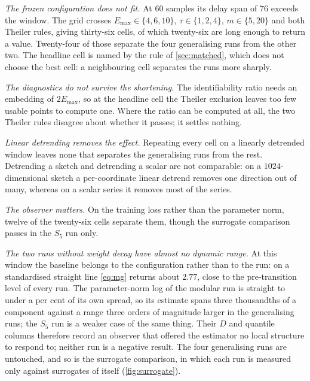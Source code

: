 \documentclass{article}
\begin{document}
\emph{The frozen configuration does not fit.} At $60$ samples its delay span of $76$ exceeds the
window. The grid crosses $E_{\max} \in \{4, 6, 10\}$,
$\tau \in \{1, 2, 4\}$, $m \in \{5, 20\}$ and both Theiler rules, giving thirty-six cells, of which
twenty-six are long enough to return a value. Twenty-four of those separate the four generalising
runs from the other two. The headline cell is named by the rule of \cref{sec:matched}, which does
not choose the best cell: a neighbouring cell separates the runs more sharply.

\emph{The diagnostics do not survive the shortening.} The identifiability ratio needs an embedding
of $2E_{\max}$, so at the headline cell the Theiler exclusion leaves too few usable points to
compute one. Where the ratio can be computed at all, the two Theiler rules disagree about whether
it passes; it settles nothing.

\emph{Linear detrending removes the effect.} Repeating every cell on a linearly detrended window
leaves none that separates the generalising runs from the rest. Detrending a sketch and
detrending a scalar are not comparable: on a $1024$-dimensional sketch a per-coordinate linear
detrend removes one direction out of many, whereas on a scalar series it removes most of the
series.

\emph{The observer matters.} On the training loss rather than the parameter norm, twelve of the
twenty-six cells separate them, though the surrogate comparison passes in the $S_5$ run
only.

\emph{The two runs without weight decay have almost no dynamic range.} At this window the baseline
belongs to the configuration rather than to the run: on a standardised straight line \cref{eq:mg}
returns about $2.77$, close to the pre-transition level of every run. The parameter-norm log of the
modular run is straight to under a per cent of its own spread, so its estimate spans three
thousandths of a component against a range three orders of magnitude larger in the generalising
runs; the $S_5$ run is a weaker case of the same thing. Their $D$ and quantile columns therefore
record an observer that offered the estimator no local structure to respond to; neither run is a
negative result. The four generalising runs are untouched, and so is the surrogate comparison, in
which each run is measured only against surrogates of itself (\cref{fig:surrogate}).
\end{document}
